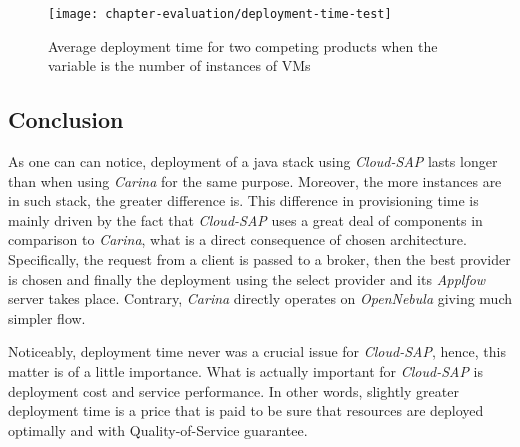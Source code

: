\begin{figure}[!ht]
  \begin{center}
    \texttt{[image: chapter-evaluation/deployment-time-test]}
  \end{center}
  \caption{Average deployment time for two competing products when the variable is the number of instances of VMs}
  \label{ch7:deployment-time-test}
\end{figure}

\subsection*{Conclusion}
As one can can notice, deployment of a java stack using \emph{Cloud-SAP} lasts longer than when using \emph{Carina} for the same purpose. Moreover, the more instances are in such stack, the greater difference is. This difference in provisioning time is mainly driven by the fact that \emph{Cloud-SAP} uses a great deal of components in comparison to \emph{Carina}, what is a direct consequence of chosen architecture. Specifically, the request from a client is passed to a broker, then the best provider is chosen and finally the deployment using the select provider and its \emph{Applfow} server takes place. Contrary, \emph{Carina} directly operates on \emph{OpenNebula} giving much simpler flow.

Noticeably, deployment time never was a crucial issue for \emph{Cloud-SAP}, hence, this matter is of a little importance. What is actually important for \emph{Cloud-SAP} is deployment cost and service performance. In other words, slightly greater deployment time is a price that is paid to be sure that resources are deployed optimally and with Quality-of-Service guarantee.
